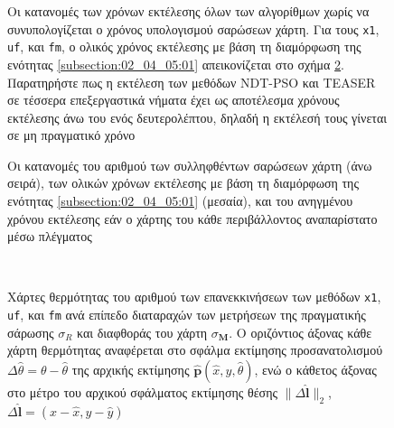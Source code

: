 \begin{figure}
  
  \vspace{1cm}
  \caption{\small Οι κατανομές των χρόνων εκτέλεσης όλων των αλγορίθμων χωρίς να
           συνυπολογίζεται ο χρόνος υπολογισμού σαρώσεων χάρτη. Για τους
           \texttt{x1}, \texttt{uf}, και \texttt{fm}, ο ολικός χρόνος εκτέλεσης
           με βάση τη διαμόρφωση της ενότητας \ref{subsection:02_04_05:01}
           απεικονίζεται στο σχήμα \ref{fig:02_04_05:03}. Παρατηρήστε πως η
           εκτέλεση των μεθόδων NDT-PSO και TEASER σε τέσσερα επεξεργαστικά
           νήματα έχει ως αποτέλεσμα χρόνους εκτέλεσης άνω του ενός
           δευτερολέπτου, δηλαδή η εκτέλεσή τους γίνεται σε μη πραγματικό
           χρόνο}
  \label{fig:02_04_05:02}
\end{figure}

\begin{figure}
  
  \vspace{1cm}
  \caption{\small Οι κατανομές του αριθμού των συλληφθέντων σαρώσεων χάρτη (άνω
           σειρά), των ολικών χρόνων εκτέλεσης με βάση τη διαμόρφωση της
           ενότητας \ref{subsection:02_04_05:01} (μεσαία), και του ανηγμένου
           χρόνου εκτέλεσης εάν ο χάρτης του κάθε περιβάλλοντος αναπαρίστατο
           μέσω πλέγματος}
  \label{fig:02_04_05:03}
\end{figure}

\begin{figure}\centering\vspace{1.5cm}
  \begin{subfigure}{\linewidth}
    
  \end{subfigure}\\\vspace{2.2cm}%
  \begin{subfigure}{\linewidth}\hspace{1.0cm}
    
  \end{subfigure}%
  \vspace{-1cm}
\caption{\small Χάρτες θερμότητας του αριθμού των επανεκκινήσεων των
         μεθόδων \texttt{x1}, \texttt{uf}, και \texttt{fm} ανά επίπεδο
         διαταραχών των μετρήσεων της πραγματικής σάρωσης $\sigma_R$ και
         διαφθοράς του χάρτη $\sigma_{\bm{M}}$. Ο οριζόντιος άξονας κάθε χάρτη
         θερμότητας αναφέρεται στο σφάλμα εκτίμησης προσανατολισμού
         $\Delta\hat{\theta} = \theta-\hat{\theta}$ της αρχικής εκτίμησης
         $\hat{\bm{p}}(\hat{x},\hat{y},\hat{\theta})$, ενώ ο κάθετος άξονας
         στο μέτρο του αρχικού σφάλματος εκτίμησης θέσης
         $\|\Delta \hat{\bm{l}}\|_2$, $\Delta\hat{\bm{l}} = (x-\hat{x}, y-\hat{y})$}
\label{fig:02_04_05:04}
\end{figure}


